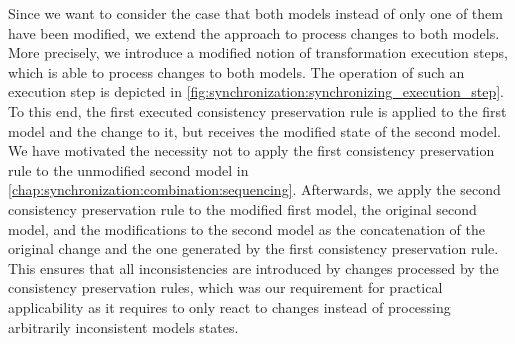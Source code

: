 Since we want to consider the case that both models instead of only one of them have been modified, we extend the approach to process changes to both models.
More precisely, we introduce a modified notion of transformation execution steps, which is able to process changes to both models.
The operation of such an execution step is depicted in \autoref{fig:synchronization:synchronizing_execution_step}.
To this end, the first executed consistency preservation rule is applied to the first model and the change to it, but receives the modified state of the second model.
We have motivated the necessity not to apply the first consistency preservation rule to the unmodified second model in \autoref{chap:synchronization:combination:sequencing}.
Afterwards, we apply the second consistency preservation rule to the modified first model, the original second model, and the modifications to the second model as the concatenation of the original change and the one generated by the first consistency preservation rule.
This ensures that all inconsistencies are introduced by changes processed by the consistency preservation rules, which was our requirement for practical applicability as it requires to only react to changes instead of processing arbitrarily inconsistent models states.


